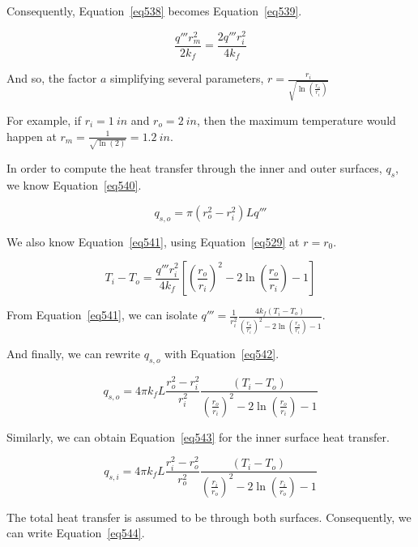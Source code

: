 Consequently, Equation~\ref{eq538} becomes Equation~\ref{eq539}.

\begin{equation}\label{eq539}
\frac{q'''r_m^2}{2k_f} = \frac{2q'''r_i^2}{4k_f}
\end{equation}

And so, the factor $a$ simplifying several parameters, $r = \frac{r_i}{\sqrt{\ln \left( \frac{r_o}{r_i} \right)}}$

For example, if $r_i = 1\ in$ and $r_o = 2\ in$, then the maximum temperature would happen at $r_m = \frac{1}{\sqrt{\ln(2)}} = 1.2\ in$.

In order to compute the heat transfer through the inner and outer surfaces, $q_s$, we know Equation~\ref{eq540}.

\begin{equation}\label{eq540}
q_{s,o} = \pi (r_o^2 - r_i^2)Lq'''
\end{equation}

We also know Equation~\ref{eq541}, using Equation~\ref{eq529} at $r=r_0$.

\begin{equation}\label{eq541}
T_i - T_o = \frac{q'''r_i^2}{4k_f}\left[ \left( \frac{r_o}{r_i} \right)^2 - 2\ln \left( \frac{r_o}{r_i} \right) - 1 \right]
\end{equation}

From Equation~\ref{eq541}, we can isolate $q''' = \frac{1}{r_i^2}\frac{4k_f(T_i - T_o)}{\left( \frac{r_o}{r_i} \right)^2 - 2\ln \left( \frac{r_o}{r_i} \right) - 1}$.

And finally, we can rewrite $q_{s,o}$ with Equation~\ref{eq542}.

\begin{equation}\label{eq542}
q_{s,o} = 4\pi k_f L \frac{r_o^2 - r_i^2}{r_i^2}\frac{(T_i - T_o)}{\left( \frac{r_o}{r_i} \right)^2 - 2\ln \left( \frac{r_o}{r_i} \right) - 1}
\end{equation}

Similarly, we can obtain Equation~\ref{eq543} for the inner surface heat transfer.


\begin{equation}\label{eq543}
q_{s,i} = 4\pi k_f L \frac{r_i^2 - r_o^2}{r_o^2}\frac{(T_i - T_o)}{\left( \frac{r_i}{r_o} \right)^2 - 2\ln \left( \frac{r_i}{r_o} \right) - 1}
\end{equation}

The total heat transfer is assumed to be through both surfaces. Consequently, we can write Equation~\ref{eq544}.

